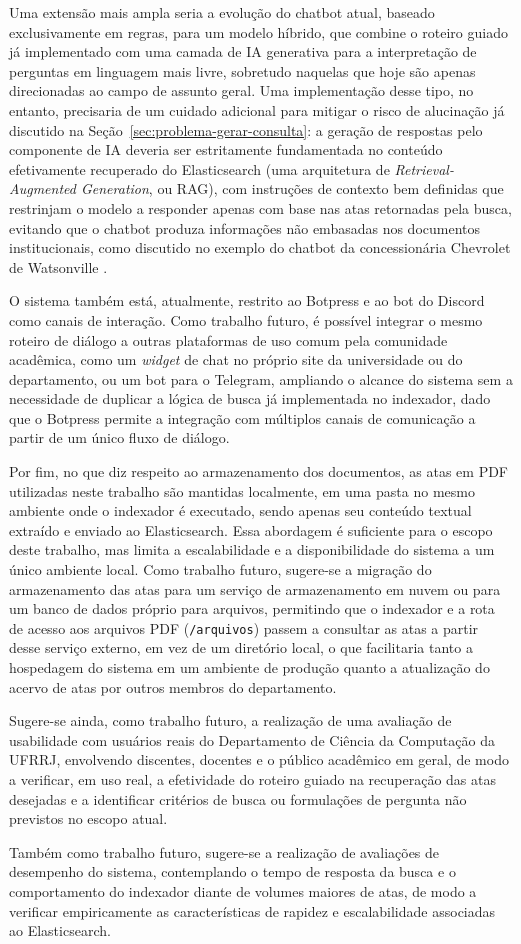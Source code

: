 Uma extensão mais ampla seria a evolução do chatbot atual, baseado exclusivamente em regras, para um modelo híbrido, que combine o roteiro guiado já implementado com uma camada de IA generativa para a interpretação de perguntas em linguagem mais livre, sobretudo naquelas que hoje são apenas direcionadas ao campo de assunto geral. Uma implementação desse tipo, no entanto, precisaria de um cuidado adicional para mitigar o risco de alucinação já discutido na Seção~\ref{sec:problema-gerar-consulta}: a geração de respostas pelo componente de IA deveria ser estritamente fundamentada no conteúdo efetivamente recuperado do Elasticsearch (uma arquitetura de \textit{Retrieval-Augmented Generation}, ou RAG), com instruções de contexto bem definidas que restrinjam o modelo a responder apenas com base nas atas retornadas pela busca, evitando que o chatbot produza informações não embasadas nos documentos institucionais, como discutido no exemplo do chatbot da concessionária Chevrolet de Watsonville \cite{aiincidentdb622, venturebeat-chevy}.

O sistema também está, atualmente, restrito ao Botpress e ao bot do Discord como canais de interação. Como trabalho futuro, é possível integrar o mesmo roteiro de diálogo a outras plataformas de uso comum pela comunidade acadêmica, como um \textit{widget} de chat no próprio site da universidade ou do departamento, ou um bot para o Telegram, ampliando o alcance do sistema sem a necessidade de duplicar a lógica de busca já implementada no indexador, dado que o Botpress permite a integração com múltiplos canais de comunicação a partir de um único fluxo de diálogo.

Por fim, no que diz respeito ao armazenamento dos documentos, as atas em PDF utilizadas neste trabalho são mantidas localmente, em uma pasta no mesmo ambiente onde o indexador é executado, sendo apenas seu conteúdo textual extraído e enviado ao Elasticsearch. Essa abordagem é suficiente para o escopo deste trabalho, mas limita a escalabilidade e a disponibilidade do sistema a um único ambiente local. Como trabalho futuro, sugere-se a migração do armazenamento das atas para um serviço de armazenamento em nuvem ou para um banco de dados próprio para arquivos, permitindo que o indexador e a rota de acesso aos arquivos PDF (\texttt{/arquivos}) passem a consultar as atas a partir desse serviço externo, em vez de um diretório local, o que facilitaria tanto a hospedagem do sistema em um ambiente de produção quanto a atualização do acervo de atas por outros membros do departamento.

Sugere-se ainda, como trabalho futuro, a realização de uma avaliação de usabilidade com usuários reais do Departamento de Ciência da Computação da UFRRJ, envolvendo discentes, docentes e o público acadêmico em geral, de modo a verificar, em uso real, a efetividade do roteiro guiado na recuperação das atas desejadas e a identificar critérios de busca ou formulações de pergunta não previstos no escopo atual.

Também como trabalho futuro, sugere-se a realização de avaliações de desempenho do sistema, contemplando o tempo de resposta da busca e o comportamento do indexador diante de volumes maiores de atas, de modo a verificar empiricamente as características de rapidez e escalabilidade associadas ao Elasticsearch.
